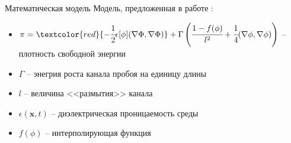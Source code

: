 \begin{frame}{Математическая модель}
Модель, предложенная в работе \cite{pitike_dielectric_breakdown}:
\begin{itemize}
	\item $\pi = \textcolor{red}{-\cfrac{1}{2} \epsilon[\phi] (\nabla \Phi, \nabla \Phi)} +
	\Gamma \left( \cfrac{1 - f(\phi)}{l^2} + \cfrac{1}{4} (\nabla \phi, \nabla \phi) \right)$
	-- плотность свободной энергии
	\item $\Gamma$ -- энегрия роста канала пробоя на единицу длины
	\item $l$ -- величина <<размытия>> канала
	\item $\epsilon(\textbf{x}, t)$ -- диэлектрическая проницаемость среды
	\item $f(\phi)$ -- интерполирующая функция
\end{itemize}
\end{frame}


